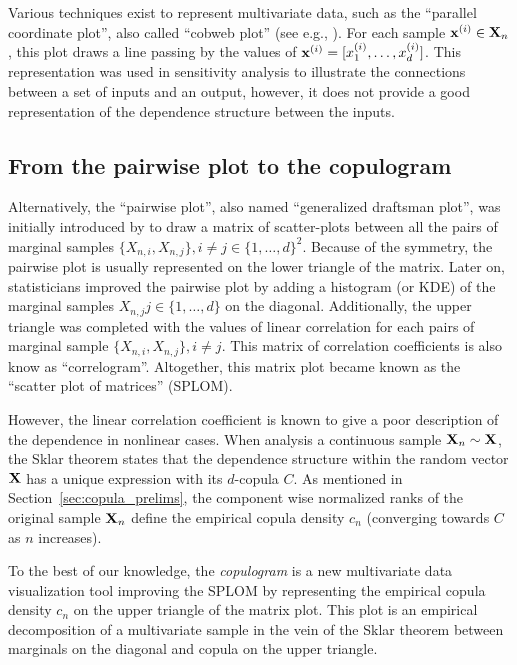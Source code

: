 Various techniques exist to represent multivariate data, such as the ``parallel coordinate plot'', also called ``cobweb plot'' (see e.g., \citealp{heinrich_2013_cobweb}). 
For each sample ${\bf x}^{(i)} \in {\bf X}_n$, this plot draws a line passing by the values of ${\bf x}^{(i)} = [x_1^{(i)}, \dots, x_d^{(i)}]$. 
This representation was used in sensitivity analysis to illustrate the connections between a set of inputs and an output, however, it does not provide a good representation of the dependence structure between the inputs. 

\subsection{From the pairwise plot to the copulogram}
Alternatively, the ``pairwise plot'', also named ``generalized draftsman plot'', was initially introduced by \citet{hartigan_1975_splom} to draw a matrix of scatter-plots between all the pairs of marginal samples $\{X_{n, i}, X_{n, j}\}, i \ne j \in \{1, \dots, d\}^2$. 
Because of the symmetry, the pairwise plot is usually represented on the lower triangle of the matrix. 
Later on, statisticians improved the pairwise plot by adding a histogram (or KDE) of the marginal samples $X_{n, j} j \in \{1, \dots, d\}$ on the diagonal. 
Additionally, the upper triangle was completed with the values of linear correlation for each pairs of marginal sample $\{X_{n, i}, X_{n, j}\}, i \ne j$. 
This matrix of correlation coefficients is also know as ``correlogram''. 
Altogether, this matrix plot became known as the ``scatter plot of matrices'' (SPLOM). 

However, the linear correlation coefficient is known to give a poor description of the dependence in nonlinear cases. 
When analysis a continuous sample ${\bf X}_n \sim {\bf X}$, the Sklar theorem states that the dependence structure within the random vector ${\bf X}$ has a unique expression with its $d$-copula $C$. 
As mentioned in Section~\ref{sec:copula_prelims}, the component wise normalized ranks of the original sample ${\bf X}_n$ define the empirical copula density $c_n$ (converging towards $C$ as $n$ increases).

To the best of our knowledge, the \textit{copulogram} is a new multivariate data visualization tool improving the SPLOM by representing the empirical copula density $c_n$ on the upper triangle of the matrix plot. 
This plot is an empirical decomposition of a multivariate sample in the vein of the Sklar theorem between marginals on the diagonal and copula on the upper triangle.

